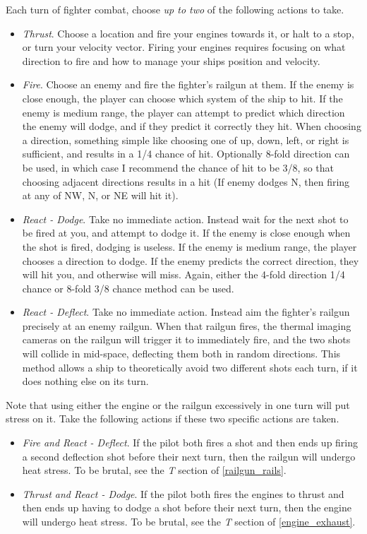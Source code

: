 \documentclass[a4paper]{article}
\begin{document}
Each turn of fighter combat, choose \textit{up to two} of the following actions to take.
\begin{itemize}
\item \textit{Thrust}. Choose a location and fire your engines towards it, or halt to a stop, or turn your velocity vector. Firing your engines requires focusing on what direction to fire and how to manage your ships position and velocity.
\item \textit{Fire}. Choose an enemy and fire the fighter's railgun at them. If the enemy is close enough, the player can choose which system of the ship to hit. If the enemy is medium range, the player can attempt to predict which direction the enemy will dodge, and if they predict it correctly they hit. When choosing a direction, something simple like choosing one of up, down, left, or right is sufficient, and results in a 1/4 chance of hit. Optionally 8-fold direction can be used, in which case I recommend the chance of hit to be 3/8, so that choosing adjacent directions results in a hit (If enemy dodges N, then firing at any of NW, N, or NE will hit it).
\item \textit{React - Dodge}. Take no immediate action. Instead wait for the next shot to be fired at you, and attempt to dodge it. If the enemy is close enough when the shot is fired, dodging is useless. If the enemy is medium range, the player chooses a direction to dodge. If the enemy predicts the correct direction, they will hit you, and otherwise will miss. Again, either the 4-fold direction 1/4 chance or 8-fold 3/8 chance method can be used.
\item \textit{React - Deflect}. Take no immediate action. Instead aim the fighter's railgun precisely at an enemy railgun. When that railgun fires, the thermal imaging cameras on the railgun will trigger it to immediately fire, and the two shots will collide in mid-space, deflecting them both in random directions. This method allows a ship to theoretically avoid two different shots each turn, if it does nothing else on its turn.
\end{itemize}

\vspace{0.2cm} \hspace{-17pt} Note that using either the engine or the railgun excessively in one turn will put stress on it. Take the following actions if these two specific actions are taken.
\begin{itemize}
\item \textit{Fire and React - Deflect}. If the pilot both fires a shot and then ends up firing a second deflection shot before their next turn, then the railgun will undergo heat stress. To be brutal, see the \textit{T} section of \ref{railgun_rails}.
\item \textit{Thrust and React - Dodge}. If the pilot both fires the engines to thrust and then ends up having to dodge a shot before their next turn, then the engine will undergo heat stress. To be brutal, see the \textit{T} section of \ref{engine_exhaust}.
\end{itemize}
\end{document}
